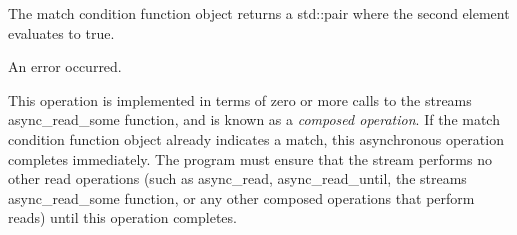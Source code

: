 \begin{DoxyItemize}
\item The match condition function object returns a std\+::pair where the second element evaluates to true.\end{DoxyItemize}
\begin{DoxyItemize}
\item An error occurred.\end{DoxyItemize}
This operation is implemented in terms of zero or more calls to the stream\textquotesingle{}s async\+\_\+read\+\_\+some function, and is known as a {\itshape composed operation}. If the match condition function object already indicates a match, this asynchronous operation completes immediately. The program must ensure that the stream performs no other read operations (such as async\+\_\+read, async\+\_\+read\+\_\+until, the stream\textquotesingle{}s async\+\_\+read\+\_\+some function, or any other composed operations that perform reads) until this operation completes.


